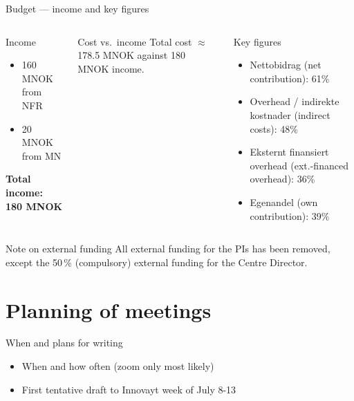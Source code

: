 \documentclass[10pt,aspectratio=169]{beamer}
\begin{document}
\begin{frame}{Budget --- income and key figures}
  \begin{columns}[T]
    \begin{block}{Income}
      \begin{itemize}
        \item 160 MNOK from NFR
        \item 20 MNOK from MN
      \end{itemize}
      \vspace{0.2em}
      \centering\textbf{Total income: 180 MNOK}
    \end{block}
    \begin{block}{Cost vs.\ income}
      Total cost $\approx$ 178.5 MNOK against 180 MNOK income.
    \end{block}

    \begin{block}{Key figures}
      \begin{itemize}
        \item Nettobidrag (net contribution): 61\%
        \item Overhead / indirekte kostnader (indirect costs): 48\%
        \item Eksternt finansiert overhead (ext.-financed overhead): 36\%
        \item Egenandel (own contribution): 39\%
      \end{itemize}
    \end{block}
  \end{columns}
  \vfill
  \begin{block}{Note on external funding}
    All external funding for the PIs has been removed, except the 50\,\% (compulsory)
    external funding for the Centre Director.
  \end{block}
\end{frame}


\section{Planning of meetings}

\begin{frame}{When and plans for writing}
  \begin{itemize}
  \item When and how often (zoom only most likely)
  \item First tentative draft to Innovayt week of July 8-13
  \end{itemize}
\end{frame}
\end{document}
